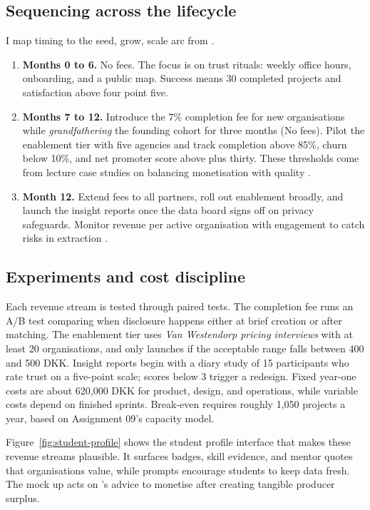 \subsection*{Sequencing across the lifecycle}
I map timing to the seed, grow, scale arc from \citet{Choudary2016}.
\begin{enumerate}
  \item \textbf{Months 0 to 6.} No fees. The focus is on trust rituals: weekly office hours, onboarding, and a public map. Success means 30 completed projects and satisfaction above four point five.
  \item \textbf{Months 7 to 12.} Introduce the 7\% completion fee for new organisations while \textit{grandfathering} the founding cohort for three months (No fees). Pilot the enablement tier with five agencies and track completion above 85\%, churn below 10\%, and net promoter score above plus thirty. These thresholds come from lecture case studies on balancing monetisation with quality \citep{Lecture05}.
  \item \textbf{Month 12.} Extend fees to all partners, roll out enablement broadly, and launch the insight reports once the data board signs off on privacy safeguards. Monitor revenue per active organisation with engagement to catch risks in extraction \citep{Srnicek2017}.
\end{enumerate}

\subsection*{Experiments and cost discipline}
Each revenue stream is tested through paired tests. The completion fee runs an A/B test comparing when disclosure happens either at brief creation or after matching. The enablement tier uses \textit{Van Westendorp pricing interviews} with at least 20 organisations, and only launches if the acceptable range falls between 400 and 500 DKK. Insight reports begin with a diary study of 15 participants who rate trust on a five-point scale; scores below 3 trigger a redesign. Fixed year-one costs are about 620,000 DKK for product, design, and operations, while variable costs depend on finished sprints. Break-even requires roughly 1,050 projects a year, based on Assignment 09’s capacity model.

Figure~\ref{fig:student-profile} shows the student profile interface that makes these revenue streams plausible. It surfaces badges, skill evidence, and mentor quotes that organisations value, while prompts encourage students to keep data fresh. The mock up acts on \citet{Choudary2016}'s advice to monetise after creating tangible producer surplus.

